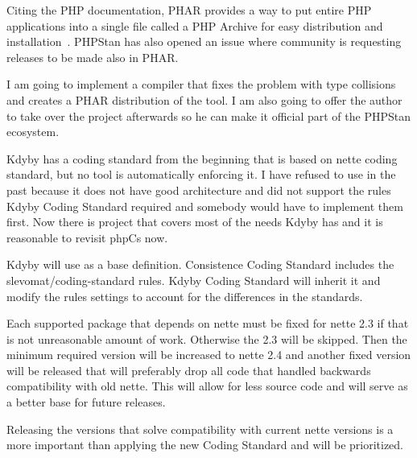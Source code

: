 Citing the PHP documentation, PHAR provides a way to put entire PHP applications into a single file called a PHP Archive for easy distribution and installation~\cite{php:phar}. PHPStan has also opened an issue  where community is requesting releases to be made also in PHAR.

I am going to implement a compiler that fixes the problem with type collisions and creates a PHAR distribution of the tool. I am also going to offer the author to take over the project afterwards so he can make it official part of the PHPStan ecosystem.


Kdyby has a coding standard from the beginning that is based on \gls{nette} coding standard, but no tool is automatically enforcing it. I have refused to use  in the past because it does not have good architecture and did not support the rules Kdyby Coding Standard required and somebody would have to implement them first. Now there is  project that covers most of the needs Kdyby has and it is reasonable to revisit \gls{phpCs} now.

Kdyby will use  as a base definition. Consistence Coding Standard includes the slevomat/coding-standard rules. Kdyby Coding Standard will inherit it and modify the rules settings to account for the differences in the standards.


Each supported package that depends on \gls{nette} must be fixed for \gls{nette} 2.3 if that is not unreasonable amount of work. Otherwise the 2.3 will be skipped. Then the minimum required version will be increased to \gls{nette} 2.4 and another fixed version will be released that will preferably drop all code that handled backwards compatibility with old \gls{nette}. This will allow for less source code and will serve as a better base for future releases.

Releasing the versions that solve compatibility with current \gls{nette} versions is a more important than applying the new Coding Standard and will be prioritized.



